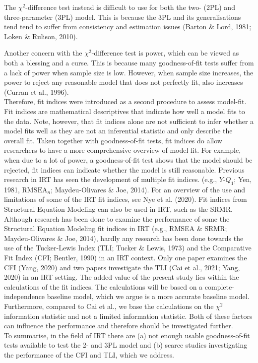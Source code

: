\documentclass[Royal,sageapa,times,doublespace]{sagej}
\begin{document}
The $\chi^2$-difference test instead is difficult to use for both the two- (2PL) and three-parameter (3PL) model. This is because the 3PL and its generalisations tend tend to suffer from consistency and estimation issues (Barton \& Lord, 1981; Loken \& Rulison, 2010). 

Another concern with the $\chi^2$-difference test is power, which can be viewed as both a blessing and a curse. This is because many goodness-of-fit tests suffer from a lack of power when sample size is low. However, when sample size increases, the power to reject any reasonable model that does not perfectly fit, also increases (Curran et al., 1996). \\


\indent Therefore, fit indices were introduced as a second procedure to assess model-fit. Fit indices are mathematical descriptives that indicate how well a model fits to the data. Note, however, that fit indices alone are not sufficient to infer whether a model fits well as they are not an inferential statistic and only describe the overall fit. Taken together with goodness-of-fit tests, fit indices do allow researchers to have a more comprehensive overview of model-fit. For example, when due to a lot of power, a goodness-of-fit test shows that the model should be rejected, fit indices can indicate whether the model is still reasonable. Previous research in IRT has seen the development of multiple fit indices. (e.g., $Y\text{-}Q_1$; Yen, 1981, $\text{RMSEA}_n$; Maydeu-Olivares \& Joe, 2014). For an overview of the use and limitations of some of the IRT fit indices, see Nye et al. (2020). Fit indices from Structural Equation Modeling can also be used in IRT, such as the SRMR. Although research has been done to examine the performance of some the Structural Equation Modeling fit indices in IRT (e.g., RMSEA \& SRMR; Maydeu-Olivares \& Joe, 2014), hardly any research has been done towards the use of the Tucker-Lewis Index (TLI; Tucker \& Lewis, 1973) and the Comparative Fit Index (CFI; Bentler, 1990) in an IRT context. Only one paper examines the CFI (Yang, 2020) and two papers investigate the TLI (Cai et al., 2021; Yang, 2020) in an IRT setting. The added value of the present study lies within the calculations of the fit indices. The calculations will be based on a complete-independence baseline model, which we argue is a more accurate baseline model. Furthermore, compared to Cai et al., we base the calculations on the $\chi^2$ information statistic and not a limited information statistic. Both of these factors can influence the performance and therefore should be investigated further. \\
\indent To summarise, in the field of IRT there are (a) not enough usable goodness-of-fit tests available to test the 2- and 3PL model and (b) scarce studies investigating the performance of the CFI and TLI, which we address.
\end{document}
